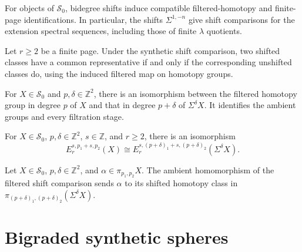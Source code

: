 \begin{definition}
\label{sem:AdamsSynthetic:ess-shifts}
For objects of $\mathcal S_0$, bidegree shifts induce compatible filtered-homotopy and finite-page identifications. In particular, the shifts $\Sigma^{1,-n}$ give shift comparisons for the extension spectral sequences, including those of finite $\lambda$ quotients.

Let $r\geq2$ be a finite page. Under the synthetic shift comparison, two shifted classes have a common representative if and only if the corresponding unshifted classes do, using the induced filtered map on homotopy groups.

For $X\in\mathcal S_0$ and $p,\delta\in\mathbb Z^2$, there is an isomorphism between the filtered homotopy group in degree $p$ of $X$ and that in degree $p+\delta$ of $\Sigma^\delta X$. It identifies the ambient groups and every filtration stage.

For $X\in\mathcal S_0$, $p,\delta\in\mathbb Z^2$, $s\in\mathbb Z$, and $r\geq2$, there is an isomorphism
\[
E_r^{s,p_1+s,p_2}(X)\cong E_r^{s,(p+\delta)_1+s,(p+\delta)_2}(\Sigma^\delta X).
\]

Let $X\in\mathcal S_0$, $p,\delta\in\mathbb Z^2$, and $\alpha\in\pi_{p_1,p_2}X$. The ambient homomorphism of the filtered shift comparison sends $\alpha$ to its shifted homotopy class in $\pi_{(p+\delta)_1,(p+\delta)_2}(\Sigma^\delta X)$.
\end{definition}


\section{Bigraded synthetic spheres}

